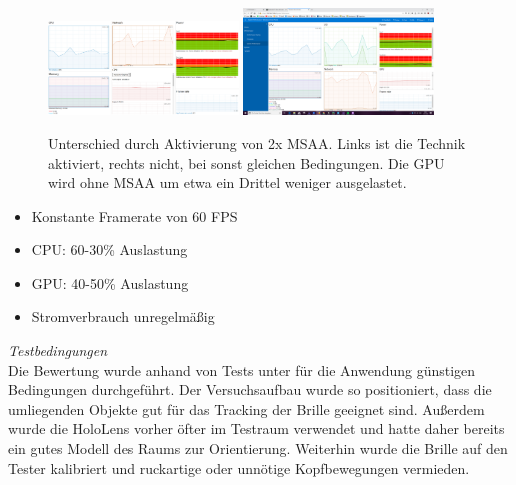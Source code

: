 \begin{figure}[h!]
	\centering
	\includegraphics[width=0.45\textwidth]{images/performance/perf_msaa_on.png}
	\hspace{0.05cm}
	\includegraphics[width=0.45\textwidth]{images/performance/perf_msaa_off.png}
	\caption{Unterschied durch Aktivierung von 2x MSAA. Links ist die Technik aktiviert, rechts nicht, bei sonst gleichen Bedingungen. Die GPU wird ohne MSAA um etwa ein Drittel weniger ausgelastet.}
	\label{img:msaa-vs-off}
\end{figure}

\begin{itemize}
	\setlength{\itemsep}{-1pt}
	\singlespacing
	\item Konstante Framerate von 60 FPS
	\item CPU: 60-30\% Auslastung
	\item GPU: 40-50\% Auslastung
	\item Stromverbrauch unregelmäßig
\end{itemize}



\textit{Testbedingungen}\\
Die Bewertung wurde anhand von Tests unter für die Anwendung günstigen Bedingungen durchgeführt. Der Versuchsaufbau wurde so positioniert, dass die umliegenden Objekte gut für das Tracking der Brille geeignet sind. Außerdem wurde die HoloLens vorher öfter im Testraum verwendet und hatte daher bereits ein gutes Modell des Raums zur Orientierung. Weiterhin wurde die Brille auf den Tester kalibriert und ruckartige oder unnötige Kopfbewegungen vermieden. 

